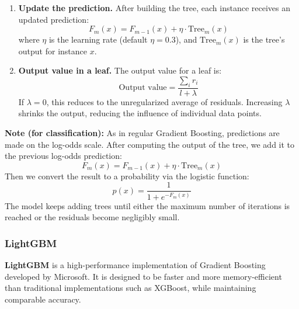 \begin{enumerate}
    \item \textbf{Update the prediction.}  
    After building the tree, each instance receives an updated prediction:
    \[
    F_m(x) = F_{m-1}(x) + \eta \cdot \text{Tree}_m(x)
    \]
    where $\eta$ is the learning rate (default $\eta = 0.3$), and $\text{Tree}_m(x)$ is the tree's output for instance $x$.

    \item \textbf{Output value in a leaf.} The output value for a leaf is:
    \[
    \text{Output value} = \frac{\sum_i r_i}{l + \lambda}
    \]
    If $\lambda = 0$, this reduces to the unregularized average of residuals. Increasing $\lambda$ shrinks the output, reducing the influence of individual data points.
\end{enumerate}

\bigskip

\noindent \textbf{Note (for classification):}
As in regular Gradient Boosting, predictions are made on the log-odds scale. After computing the output of the tree, we add it to the previous log-odds prediction:
\[
F_m(x) = F_{m-1}(x) + \eta \cdot \text{Tree}_m(x)
\]
Then we convert the result to a probability via the logistic function:
\[
p(x) = \frac{1}{1 + e^{-F_m(x)}}
\]
The model keeps adding trees until either the maximum number of iterations is reached or the residuals become negligibly small.


\subsubsection{LightGBM}
\textbf{LightGBM} is a high-performance implementation of Gradient Boosting developed by Microsoft. It is designed to be faster and more memory-efficient than traditional implementations such as XGBoost, while maintaining comparable accuracy.

